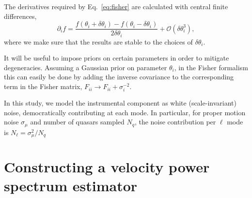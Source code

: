 \documentclass[prd,aps,10pt,nofootinbib,twocolumn,superscriptaddress,preprintnumbers,balancelastpage,longbibliography]{revtex4-1}
\newcommand{\SMS}[1]{{\bf \color{deepgreen}{[SM: #1]}}}
\begin{document}
The derivatives required by Eq.~\ref{eq:fisher} are calculated with central finite differences,
\begin{equation}
\partial_if = \frac{f(\theta_i + \delta\theta_i) - f(\theta_i - \delta\theta_i)}{2\delta\theta_i} + \mathcal{O}(\delta\theta_i^3),
\end{equation}
where we make sure that the results are stable to the choices of ${\delta\theta_i}$.

It will be useful to impose priors on certain parameters in order to mitigate degeneracies. Assuming a Gaussian prior on parameter $\theta_i$, in the Fisher formalism this can easily be done by adding the inverse covariance to the corresponding term in the Fisher matrix, $F_{ii} \rightarrow F_{ii} + \sigma_i^{-2}$.

In this study, we model the instrumental component as white (scale-invariant) noise, democratically contributing at each mode. In particular, for proper motion noise $\sigma_\mu$ and number of quasars sampled $N_q$, the noise contribution per $\ell$ mode is $N_\ell = \sigma_\mu^2/N_q$

\section{Constructing a velocity power spectrum estimator}

\SMS{Just copied this out from @kvt notes...}
\end{document}
